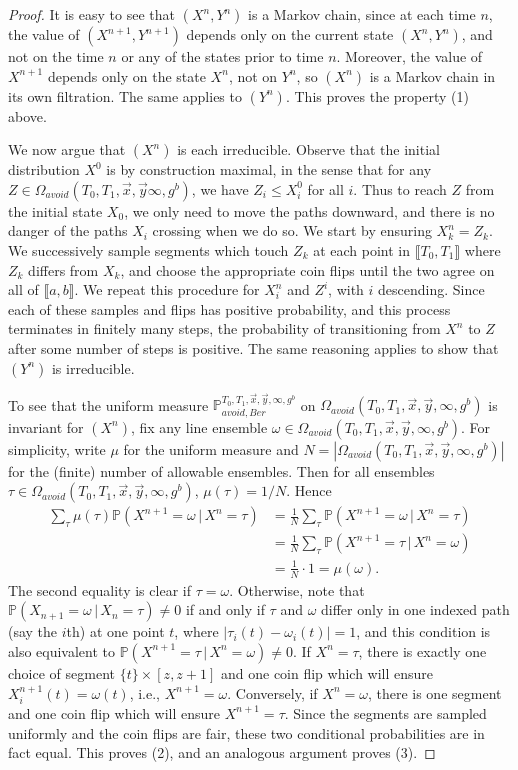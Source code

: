 \begin{proof}
	It is easy to see that $(X^n,Y^n)$ is a Markov chain, since at each time $n$, the value of $(X^{n+1},Y^{n+1})$ depends only on the current state $(X^n,Y^n)$, and not on the time $n$ or any of the states prior to time $n$. Moreover, the value of $X^{n+1}$ depends only on the state $X^n$, not on $Y^n$, so $(X^n)$ is a Markov chain in its own filtration. The same applies to $(Y^n)$. This proves the property (1) above.
	
	We now argue that $(X^n)$ is each irreducible. Observe that the initial distribution $X^0$ is by construction maximal, in the sense that for any $Z\in \Omega_{avoid}(T_0,T_1,\vec{x},\vec{y}\infty,g^b)$, we have $Z_i \leq X^0_i$ for all $i$. Thus to reach $Z$ from the initial state $X_0$, we only need to move the paths downward, and there is no danger of the paths $X_i$ crossing when we do so. We start by ensuring $X^n_k = Z_k$. We successively sample segments which touch $Z_k$ at each point in $\llbracket T_0,T_1\rrbracket$ where $Z_k$ differs from $X_k$, and choose the appropriate coin flips until the two agree on all of $\llbracket a,b\rrbracket$. We repeat this procedure for $X^n_i$ and $Z^i$, with $i$ descending. Since each of these samples and flips has positive probability, and this process terminates in finitely many steps, the probability of transitioning from $X^n$ to $Z$ after some number of steps is positive. The same reasoning applies to show that $(Y^n)$ is irreducible.
	
	To see that the uniform measure $\mathbb{P}_{avoid,Ber}^{T_0,T_1,\vec{x},\vec{y},\infty,g^b}$ on $\Omega_{avoid}(T_0,T_1,\vec{x},\vec{y},\infty,g^b)$ is invariant for $(X^n)$, fix any line ensemble $\omega\in\Omega_{avoid}(T_0,T_1,\vec{x},\vec{y},\infty,g^b)$. For simplicity, write $\mu$ for the uniform measure and $N=|\Omega_{avoid}(T_0,T_1,\vec{x},\vec{y},\infty,g^b)|$ for the (finite) number of allowable ensembles. Then for all ensembles $\tau\in\Omega_{avoid}(T_0,T_1,\vec{x},\vec{y},\infty,g^b)$, $\mu(\tau) = 1/N$. Hence
	\begin{align*}
	\sum_\tau \mu(\tau)\mathbb{P}(X^{n+1} = \omega\,|\,X^n = \tau) &= \frac{1}{N}\sum_\tau \mathbb{P}(X^{n+1} = \omega\,|\,X^n = \tau)\\
	&= \frac{1}{N}\sum_\tau \mathbb{P}(X^{n+1} = \tau\,|\,X^n = \omega)\\
	&= \frac{1}{N}\cdot 1 = \mu(\omega).
	\end{align*}
	The second equality is clear if $\tau=\omega$. Otherwise, note that $\mathbb{P}(X_{n+1} = \omega\,|\,X_n = \tau) \neq 0$ if and only if $\tau$ and $\omega$ differ only in one indexed path (say the $i$th) at one point $t$, where $|\tau_i(t)-\omega_i(t)|=1$, and this condition is also equivalent to $\mathbb{P}(X^{n+1} = \tau\,|\,X^n = \omega) \neq 0$. If $X^n=\tau$, there is exactly one choice of segment $\{t\}\times[z,z+1]$ and one coin flip which will ensure $X^{n+1}_i(t)=\omega(t)$, i.e., $X^{n+1}=\omega$. Conversely, if $X^n=\omega$, there is one segment and one coin flip which will ensure $X^{n+1}=\tau$. Since the segments are sampled uniformly and the coin flips are fair, these two conditional probabilities are in fact equal. This proves (2), and an analogous argument proves (3).
	

\end{proof}
